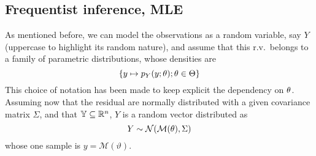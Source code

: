 \documentclass[../../Main_ManuscritThese.tex]{subfiles}
\begin{document}
\subsection{Frequentist inference, MLE}
\label{sec:frequentist_inference_MLE}
As mentioned before, we can model the observations as a random
variable, say $Y$ (uppercase to highlight its random nature), and
assume that this r.v.\ belongs to a family of parametric
distributions, whose densities are
\begin{equation}
  \label{eq:family_pdf}
  \left\{y\mapsto p_{Y}(y; \theta) ; \theta\in\Theta \right\}
\end{equation}
This choice of notation has been made to keep explicit the dependency
on $\theta$. Assuming now that the residual are normally distributed
with a given covariance matrix $\Sigma$, and that
$\mathbb{Y} \subseteq \mathbb{R}^n$, $Y$ is a random vector distributed
as
\begin{equation}
  \label{eq:lik_gaussian}
  Y  \sim \mathcal{N}(\mathcal{M}(\theta), \Sigma)
\end{equation}
whose one sample is $y=\mathscr{M}(\vartheta)$.
\end{document}
